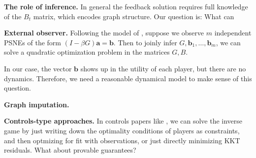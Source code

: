 {\bf The role of inference.} In general the feedback solution requires full knowledge of the $B_t$ matrix, which encodes graph structure. Our question is: What can 

{\bf External observer.} Following the model of \cite{leng2020learning}, suppose we observe $m$ independent PSNEs of the form $(I - \beta G) \bm{a} = \bm{b}$. Then to joinly infer $G, \bm{b}_1, \dots, \bm{b}_m$, we can solve a quadratic optimization problem in the matrices $G, B$. 

In our case, the vector $\bm{b}$ shows up in the utility of each player, but there are no dynamics. Therefore, we need a reasonable dynamical model to make sense of this question. 

{\bf Graph imputation.}

{\bf Controls-type approaches.} In controls papers like \cite{peters2021inferring}, we can solve the inverse game by just writing down the optimality conditions of players as constraints, and then optmizing for fit with observations, or just directly minimizing KKT residuals. What about provable guarantees? 
